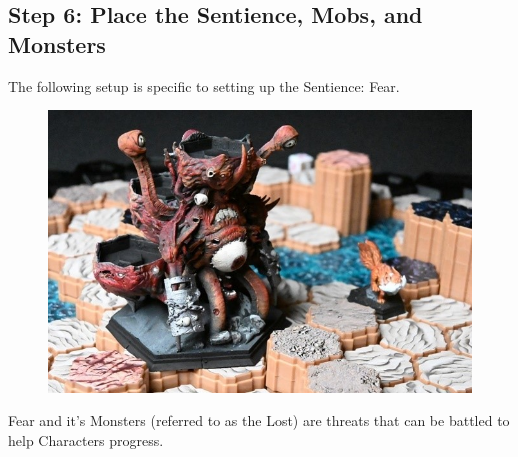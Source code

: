 \documentclass[../main.tex]{subfiles}
\begin{document}
\subsection{Step 6:  Place the Sentience, Mobs, and Monsters}
The following setup is specific to setting up the Sentience: Fear. 
\begin{figure}
    \centering
    \includegraphics[width=1\linewidth]{chapters//boardsetup/TimeStrikeSentienceFearMini.jpg} 
\end{figure}
Fear and it's Monsters (referred to as the Lost) are threats that can be battled to help Characters progress. 
\end{document}
